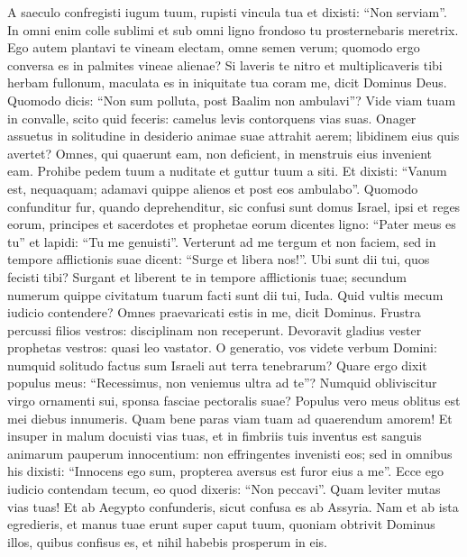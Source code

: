 \begin{biblechapter}
\verse A saeculo confregisti iugum tuum, rupisti vincula tua et dixisti: “Non serviam”. In omni enim colle sublimi et sub omni ligno frondoso tu prosternebaris meretrix. 
\verse Ego autem plantavi te vineam electam, omne semen verum; quomodo ergo conversa es in palmites vineae alienae? 
\verse Si laveris te nitro et multiplicaveris tibi herbam fullonum, maculata es in iniquitate tua coram me, dicit Dominus Deus. 
\verse Quomodo dicis: “Non sum polluta, post Baalim non ambulavi”? Vide viam tuam in convalle, scito quid feceris: camelus levis contorquens vias suas. 
\verse Onager assuetus in solitudine in desiderio animae suae attrahit aerem; libidinem eius quis avertet? Omnes, qui quaerunt eam, non deficient, in menstruis eius invenient eam. 
\verse Prohibe pedem tuum a nuditate et guttur tuum a siti. Et dixisti: “Vanum est, nequaquam; adamavi quippe alienos et post eos ambulabo”. 
\verse Quomodo confunditur fur, quando deprehenditur, sic confusi sunt domus Israel, ipsi et reges eorum, principes et sacerdotes et prophetae eorum 
\verse dicentes ligno: “Pater meus es tu” et lapidi: “Tu me genuisti”. Verterunt ad me tergum et non faciem, sed in tempore afflictionis suae dicent: “Surge et libera nos!”. 
\verse Ubi sunt dii tui, quos fecisti tibi? Surgant et liberent te in tempore afflictionis tuae; secundum numerum quippe civitatum tuarum facti sunt dii tui, Iuda. 
\verse Quid vultis mecum iudicio contendere? Omnes praevaricati estis in me, dicit Dominus. 
\verse Frustra percussi filios vestros: disciplinam non receperunt. Devoravit gladius vester prophetas vestros: quasi leo vastator. 
\verse O generatio, vos videte verbum Domini: numquid solitudo factus sum Israeli aut terra tenebrarum? Quare ergo dixit populus meus: “Recessimus, non veniemus ultra ad te”? 
\verse Numquid obliviscitur virgo ornamenti sui, sponsa fasciae pectoralis suae? Populus vero meus oblitus est mei diebus innumeris. 
\verse Quam bene paras viam tuam ad quaerendum amorem! Et insuper in malum docuisti vias tuas, 
\verse et in fimbriis tuis inventus est sanguis animarum pauperum innocentium: non effringentes invenisti eos; sed in omnibus his 
\verse dixisti: “Innocens ego sum, propterea aversus est furor eius a me”. Ecce ego iudicio contendam tecum, eo quod dixeris: “Non peccavi”. 
\verse Quam leviter mutas vias tuas! Et ab Aegypto confunderis, sicut confusa es ab Assyria. 
\verse Nam et ab ista egredieris, et manus tuae erunt super caput tuum, quoniam obtrivit Dominus illos, quibus confisus es, et nihil habebis prosperum in eis. 
\end{biblechapter}


